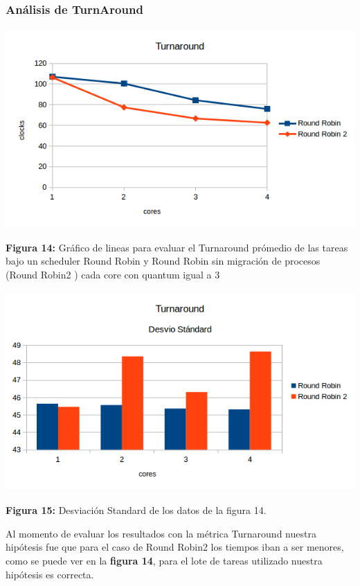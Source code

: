 \documentclass[a4paper]{article}
\begin{document}
\subsubsection*{An\'alisis de TurnAround}


\includegraphics[width=\textwidth,height=3.0in,keepaspectratio
]{imagenes/ej8/ta.png} \\
\begin {flushleft}
\textbf{Figura 14:} Gráfico de lineas para evaluar el Turnaround prómedio de las tareas bajo un scheduler Round Robin y Round Robin sin migración de procesos (Round Robin2 ) cada core con quantum igual a 3
\end{flushleft}	



\includegraphics[width=\textwidth,height=3.0in,keepaspectratio
]{imagenes/ej8/tads.png} \\
\begin {flushleft}
\textbf{Figura 15:} Desviación Standard de los datos de la figura 14.
\end{flushleft}	

Al momento de evaluar los resultados con la métrica Turnaround nuestra hipótesis fue que para el caso de Round Robin2 los tiempos iban a ser menores, como se puede ver en la \textbf{figura 14}, para el lote de tareas utilizado nuestra hipótesis es correcta. 
\end{document}
